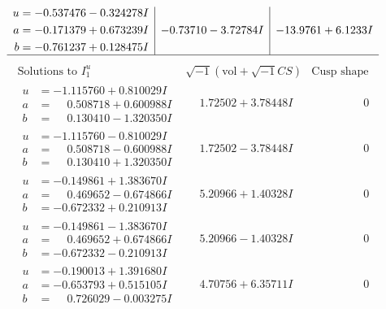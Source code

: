 \documentclass[1p]{elsarticle_modified}
\theoremstyle{definition}
\newcommand{\I}{\sqrt{-1}}
\begin{document}
$$\begin{array}{c|c|c}
\begin{aligned}
u &= -0.537476 - 0.324278 I \\
a &= -0.171379 + 0.673239 I \\
b &= -0.761237 + 0.128475 I\end{aligned}
 & -0.73710 - 3.72784 I & -13.9761 + 6.1233 I\\
 \hline 
 \end{array}$$\newpage$$\begin{array}{c|c|c}  
\text{Solutions to }I^u_{1}& \I (\text{vol} + \sqrt{-1}CS) & \text{Cusp shape}\\
 \hline 
\begin{aligned}
u &= -1.115760 + 0.810029 I \\
a &= \phantom{-}0.508718 + 0.600988 I \\
b &= \phantom{-}0.130410 - 1.320350 I\end{aligned}
 & \phantom{-}1.72502 + 3.78448 I & \phantom{-0.000000 } 0 \\ \hline\begin{aligned}
u &= -1.115760 - 0.810029 I \\
a &= \phantom{-}0.508718 - 0.600988 I \\
b &= \phantom{-}0.130410 + 1.320350 I\end{aligned}
 & \phantom{-}1.72502 - 3.78448 I & \phantom{-0.000000 } 0 \\ \hline\begin{aligned}
u &= -0.149861 + 1.383670 I \\
a &= \phantom{-}0.469652 - 0.674866 I \\
b &= -0.672332 + 0.210913 I\end{aligned}
 & \phantom{-}5.20966 + 1.40328 I & \phantom{-0.000000 } 0 \\ \hline\begin{aligned}
u &= -0.149861 - 1.383670 I \\
a &= \phantom{-}0.469652 + 0.674866 I \\
b &= -0.672332 - 0.210913 I\end{aligned}
 & \phantom{-}5.20966 - 1.40328 I & \phantom{-0.000000 } 0 \\ \hline\begin{aligned}
u &= -0.190013 + 1.391680 I \\
a &= -0.653793 + 0.515105 I \\
b &= \phantom{-}0.726029 - 0.003275 I\end{aligned}
 & \phantom{-}4.70756 + 6.35711 I & \phantom{-0.000000 } 0 \\ \hline\begin{aligned}

\end{aligned}
\end{array}$$
\end{document}
